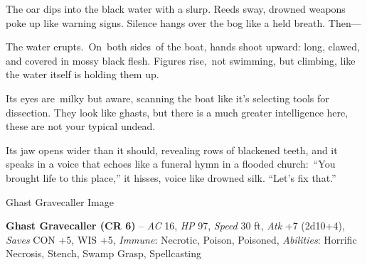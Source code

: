 \documentclass[10pt,twocolumn]{article}
\let\oldtextbf\textbf
\renewcommand{\textbf}[1]{\oldtextbf{{#1}}}
\renewenvironment{quote}
  {%
    \begingroup
      \setlength{\parindent}{1em}%
      \setlength{\parskip}{0pt}%
      \begin{tcolorbox}[myquote,
        before upper={%
          \let\textbf\oldtextbf
          \setlength{\parindent}{1.5em}%
          \setlength{\parskip}{0pt}%
          \noindent              %
        }%
      ]%
  }
  {%
      \end{tcolorbox}%
    \endgroup
  }
\begin{document}
\begin{quote}
The oar dips into the black water with a slurp. Reeds sway, drowned
weapons poke up like warning signs. Silence hangs over the bog like a
held breath. Then---

The water erupts.~On~both sides~of the boat, hands shoot upward: long,
clawed, and covered in mossy black flesh. Figures rise,~not swimming,
but climbing, like the water itself is holding them up.

Its eyes are~milky but aware, scanning the boat like it's selecting
tools for dissection. They look like ghasts, but there is a much greater
intelligence here, these are not your typical undead.

Its jaw opens wider than it should, revealing rows of blackened teeth,
and it speaks in a voice that echoes like a funeral hymn in a flooded
church:~``You brought life to this place,'' it hisses, voice like
drowned silk. ``Let's fix that.''
\end{quote}

\begin{tcolorbox}[
  colback={imagecolor},
  coltext=black,
  colframe=black,
  boxrule=1pt,
  arc=6pt,
  left=4pt,
  right=4pt,
  top=2pt,
  bottom=2pt,
  boxsep=4pt,
  before skip=10pt,
  after skip=10pt,
  fontupper={\blockquoteFont\small\linespread{0.9}\selectfont\color{black}}
]

\faPhotoVideo\hspace{0.8em}\begin{minipage}[t]{\dimexpr\linewidth-1.8em\hangindent=1.8em\hangafter=0}Ghast
Gravecaller Image

\end{minipage}\end{tcolorbox}

\begin{tcolorbox}[
  enhanced,
  breakable,
  colback={encountercolor},
  colframe=black,
  boxrule=1pt,
  coltext=black,
  arc=6pt,
  left=4pt,
  right=4pt,
  top=2pt,
  bottom=2pt,
  boxsep=4pt,
  before skip=10pt,
  after skip=10pt,
  fontupper={\blockquoteFont\small\linespread{0.9}\selectfont\color{black}}
]

\faSkull\hspace{0.8em}\begin{minipage}[t]{\dimexpr\linewidth-1.8em\hangindent=1.8em\hangafter=0}\textbf{Ghast
Gravecaller (CR 6)} -- \emph{AC} 16, \emph{HP} 97, \emph{Speed} 30 ft,
\emph{Atk} +7 (2d10+4), \emph{Saves} CON +5, WIS +5, \emph{Immune}:
Necrotic, Poison, Poisoned, \emph{Abilities}: Horrific Necrosis, Stench,
Swamp Grasp, Spellcasting

\end{minipage}\end{tcolorbox}
\end{document}
